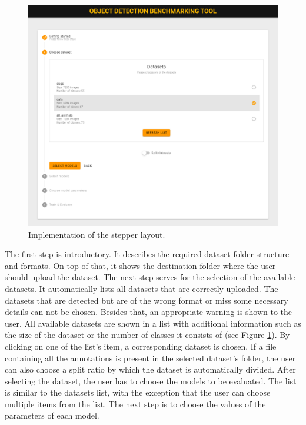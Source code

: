 \begin{figure}[h]
    \centering
    \includegraphics[width=0.85\linewidth]{Sources/Figures/datasets_selection.png}
    \caption{Implementation of the stepper layout.}
    \label{fig:datasets_selection}
\end{figure}

The first step is introductory. It describes the required dataset folder
structure and formats. On top of that, it shows the destination folder where the
user should upload the dataset. The next step serves for the selection of the
available datasets. It automatically lists all datasets that are correctly
uploaded. The datasets that are detected but are of the wrong format or miss
some necessary details can not be chosen. Besides that, an appropriate warning
is shown to the user. All available datasets are shown in a list with additional
information such as the size of the dataset or the number of classes it consists
of (see Figure \ref{fig:datasets_selection}). By clicking on one of the list's
item, a corresponding dataset is chosen. If a file containing all the
annotations is present in the selected dataset's folder, the user can also
choose a split ratio by which the dataset is automatically divided. After
selecting the dataset, the user has to choose the models to be evaluated. The
list is similar to the datasets list, with the exception that the user can
choose multiple items from the list. The next step is to choose the values of
the parameters of each model.

